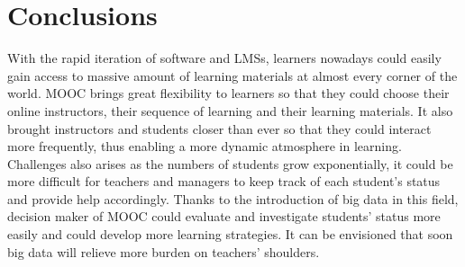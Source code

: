 \documentclass[sigconf]{acmart}
\begin{document}
\section{Conclusions}
With the rapid iteration of software and LMSs, learners nowadays could easily gain access to massive amount of learning materials at almost every corner of the world. MOOC brings great flexibility to learners so that they could choose their online instructors, their sequence of learning and their learning materials. It also brought instructors and students closer than ever so that they could interact more frequently, thus enabling a more dynamic atmosphere in learning. Challenges also arises as the numbers of students grow exponentially, it could be more difficult for teachers and managers to keep track of each student's status and provide help accordingly. Thanks to the introduction of big data in this field, decision maker of MOOC could evaluate and investigate students' status more easily and could develop more learning strategies. It can be envisioned that soon big data will relieve more burden on teachers' shoulders.




 
\end{document}

